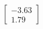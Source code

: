 \documentclass[preview]{standalone}
\begin{document}
\begin{align*}
\begin{bmatrix} -3.63 \\ 1.79 \end{bmatrix}
\end{align*}
\end{document}
